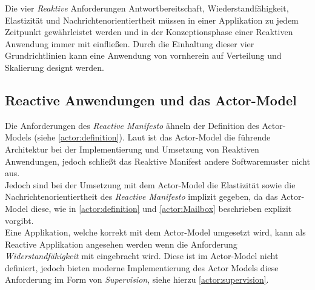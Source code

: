Die vier \textit{Reaktive} Anforderungen Antwortbereitschaft, Wiederstandfähigkeit, Elastizität und Nachrichtenorientiertheit müssen in einer Applikation zu jedem Zeitpunkt gewährleistet werden und in der Konzeptionsphase einer Reaktiven Anwendung immer mit einfließen. Durch die Einhaltung dieser vier Grundrichtlinien kann eine Anwendung von vornherein auf Verteilung und Skalierung designt werden.
% 
% 

\subsection{Reactive Anwendungen und das Actor-Model}
Die Anforderungen des \textit{Reactive Manifesto} ähneln der Definition des Actor-Models (siehe \ref{actor:definition}). Laut \cite{Vernon2015ReactiveAkka} ist das Actor-Model die führende Architektur bei der Implementierung und Umsetzung von Reaktiven Anwendungen, jedoch schließt das Reaktive Manifest andere Softwaremuster nicht aus. \\
Jedoch sind bei der Umsetzung mit dem Actor-Model die Elastizität sowie die Nachrichtenorientiertheit des \textit{Reactive Manifesto} implizit gegeben, da das Actor-Model diese, wie in \ref{actor:definition} und \ref{actor:Mailbox} beschrieben explizit vorgibt.\\
% 
% 
Eine Applikation, welche korrekt mit dem Actor-Model umgesetzt wird, kann als Reactive Applikation angesehen werden wenn die Anforderung \textit{Widerstandfähigkeit} mit eingebracht wird. Diese ist im Actor-Model nicht definiert, jedoch bieten moderne Implementierung des Actor Models diese Anforderung im Form von \textit{Supervision}, siehe hierzu \ref{actor:supervision}.
